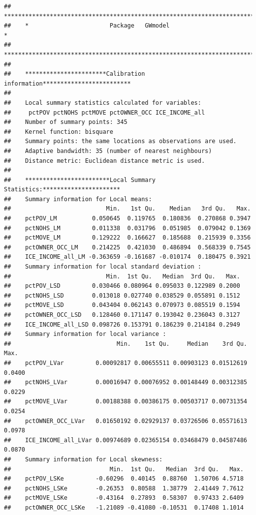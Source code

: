\documentclass[
]{book}
\begin{document}
\begin{lstlisting}
##    ***********************************************************************
##    *                       Package   GWmodel                             *
##    ***********************************************************************
## 
##    ***********************Calibration information*************************
## 
##    Local summary statistics calculated for variables:
##     pctPOV pctNOHS pctMOVE pctOWNER_OCC ICE_INCOME_all
##    Number of summary points: 345
##    Kernel function: bisquare 
##    Summary points: the same locations as observations are used.
##    Adaptive bandwidth: 35 (number of nearest neighbours)
##    Distance metric: Euclidean distance metric is used.
## 
##    ************************Local Summary Statistics:**********************
##    Summary information for Local means:
##                           Min.   1st Qu.    Median   3rd Qu.   Max.
##    pctPOV_LM          0.050645  0.119765  0.180836  0.270868 0.3947
##    pctNOHS_LM         0.011338  0.031796  0.051985  0.079042 0.1369
##    pctMOVE_LM         0.129222  0.166627  0.185688  0.215939 0.3356
##    pctOWNER_OCC_LM    0.214225  0.421030  0.486894  0.568339 0.7545
##    ICE_INCOME_all_LM -0.363659 -0.161687 -0.010174  0.180475 0.3921
##    Summary information for local standard deviation :
##                           Min.  1st Qu.   Median  3rd Qu.   Max.
##    pctPOV_LSD         0.030466 0.080964 0.095033 0.122989 0.2000
##    pctNOHS_LSD        0.013018 0.027740 0.038529 0.055891 0.1512
##    pctMOVE_LSD        0.043404 0.062143 0.070973 0.085519 0.1594
##    pctOWNER_OCC_LSD   0.128460 0.171147 0.193042 0.236043 0.3127
##    ICE_INCOME_all_LSD 0.098726 0.153791 0.186239 0.214184 0.2949
##    Summary information for local variance :
##                              Min.    1st Qu.     Median    3rd Qu.   Max.
##    pctPOV_LVar         0.00092817 0.00655511 0.00903123 0.01512619 0.0400
##    pctNOHS_LVar        0.00016947 0.00076952 0.00148449 0.00312385 0.0229
##    pctMOVE_LVar        0.00188388 0.00386175 0.00503717 0.00731354 0.0254
##    pctOWNER_OCC_LVar   0.01650192 0.02929137 0.03726506 0.05571613 0.0978
##    ICE_INCOME_all_LVar 0.00974689 0.02365154 0.03468479 0.04587486 0.0870
##    Summary information for Local skewness:
##                            Min.  1st Qu.   Median  3rd Qu.   Max.
##    pctPOV_LSKe         -0.60296  0.40145  0.88760  1.50706 4.5718
##    pctNOHS_LSKe        -0.26353  0.80588  1.38779  2.41449 7.7612
##    pctMOVE_LSKe        -0.43164  0.27893  0.58307  0.97433 2.6409
##    pctOWNER_OCC_LSKe   -1.21089 -0.41080 -0.10531  0.17408 1.1014

\end{lstlisting}
\end{document}
